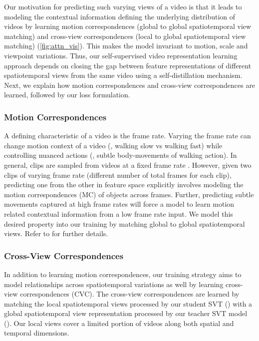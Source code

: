 \documentclass[10pt,twocolumn,letterpaper]{article}
\begin{document}
Our motivation for predicting such varying views of a video is that it leads to modeling the contextual information defining the underlying distribution of videos by learning motion correspondences (global to global spatiotemporal view matching) and cross-view correspondences (local to global spatiotemporal view matching) (\cref{fig:attn_vis}).  This makes the model invariant to motion, scale and viewpoint variations. Thus, our self-supervised video representation learning approach depends on closing the gap between feature representations of different spatiotemporal views from the same video using a self-distillation mechanism. Next, we explain how motion correspondences and cross-view correspondences are learned, followed by our loss formulation. 

\vspace{-0.7em}
\subsubsection{Motion Correspondences}
\label{subsec:mo_pred}
\vspace{-0.5em}
A defining characteristic of a video is the frame rate. Varying the frame rate can change motion context of a video (\eg, walking slow vs walking fast) while controlling nuanced actions (\eg, subtle body-movements of walking action). In general, clips are sampled from videos at a fixed frame rate \cite{qian2020spatiotemporal, xiao2021modist}. However, given two clips of varying frame rate (different number of total frames for each clip), predicting one from the other in feature space explicitly involves modeling the motion correspondences (MC) of objects across frames. Further, predicting subtle movements captured at high frame rates will force a model to learn motion related contextual information from a low frame rate input. We model this desired property into our training by matching global to global spatiotemporal views. Refer to  for further details. 

\vspace{-0.7em}
\subsubsection{Cross-View Correspondences}
\label{subsec:cross_view_corr}
\vspace{-0.5em}
In addition to learning motion correspondences, our training strategy aims to model relationships across spatiotemporal variations as well by learning cross-view correspondences (CVC). The cross-view correspondences are learned by matching the local spatiotemporal views processed by our student SVT () with a global spatiotemporal view representation processed by our teacher SVT model (). Our local views cover a limited portion of videos along both spatial and temporal dimensions. 
\end{document}
